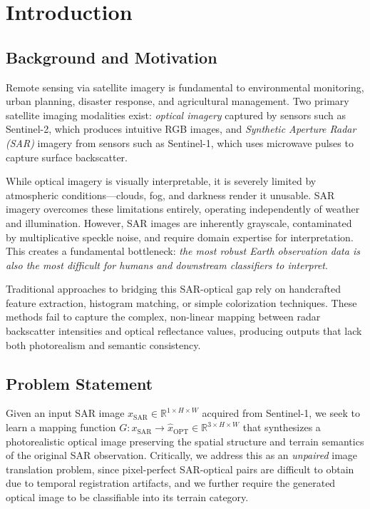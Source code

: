 \documentclass[conference]{IEEEtran}
\begin{document}
\section{Introduction}

\subsection{Background and Motivation}

Remote sensing via satellite imagery is fundamental to environmental monitoring, urban planning, disaster response, and agricultural management. Two primary satellite imaging modalities exist: \textit{optical imagery} captured by sensors such as Sentinel-2, which produces intuitive RGB images, and \textit{Synthetic Aperture Radar (SAR)} imagery from sensors such as Sentinel-1, which uses microwave pulses to capture surface backscatter.

While optical imagery is visually interpretable, it is severely limited by atmospheric conditions---clouds, fog, and darkness render it unusable. SAR imagery overcomes these limitations entirely, operating independently of weather and illumination. However, SAR images are inherently grayscale, contaminated by multiplicative speckle noise, and require domain expertise for interpretation. This creates a fundamental bottleneck: \textit{the most robust Earth observation data is also the most difficult for humans and downstream classifiers to interpret}.

Traditional approaches to bridging this SAR-optical gap rely on handcrafted feature extraction, histogram matching, or simple colorization techniques. These methods fail to capture the complex, non-linear mapping between radar backscatter intensities and optical reflectance values, producing outputs that lack both photorealism and semantic consistency.

\subsection{Problem Statement}

Given an input SAR image $x_{\text{SAR}} \in \mathbb{R}^{1 \times H \times W}$ acquired from Sentinel-1, we seek to learn a mapping function $G: x_{\text{SAR}} \rightarrow \hat{x}_{\text{OPT}} \in \mathbb{R}^{3 \times H \times W}$ that synthesizes a photorealistic optical image preserving the spatial structure and terrain semantics of the original SAR observation. Critically, we address this as an \textit{unpaired} image translation problem, since pixel-perfect SAR-optical pairs are difficult to obtain due to temporal registration artifacts, and we further require the generated optical image to be classifiable into its terrain category.
\end{document}
